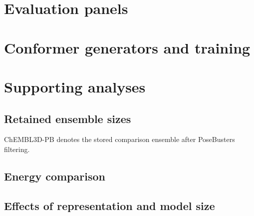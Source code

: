 \providecommand{\manuscriptroot}{}
\section*{Evaluation panels}

\clearpage

\clearpage

\clearpage

\section*{Conformer generators and training}

\clearpage

\clearpage


\clearpage

\section*{Supporting analyses}
\subsection*{Retained ensemble sizes}
ChEMBL3D-PB denotes the stored comparison ensemble after PoseBusters filtering.

\clearpage
\subsection*{Energy comparison}

\clearpage
\subsection*{Effects of representation and model size}


\clearpage

\clearpage

\clearpage

\clearpage

\clearpage
